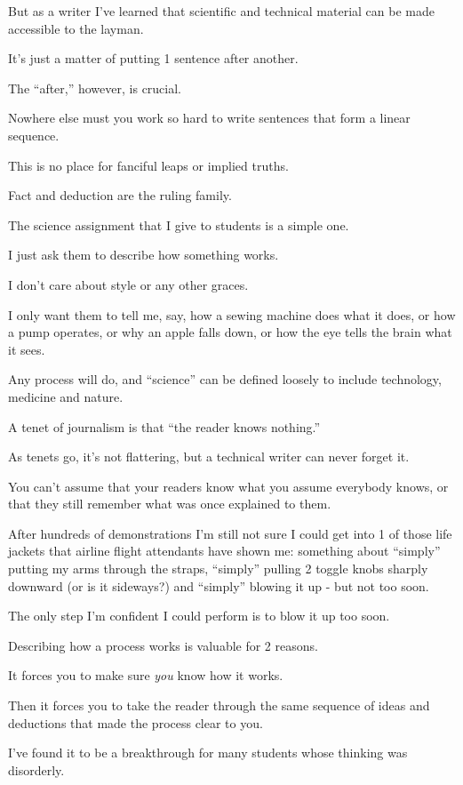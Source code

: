 \documentclass{book}
\numberwithin{equation}{section}
\begin{document}
But as a writer I've learned that scientific and technical material can be made accessible to the layman.

It's just a matter of putting 1 sentence after another.

The ``after,'' however, is crucial.

Nowhere else must you work so hard to write sentences that form a linear sequence.

This is no place for fanciful leaps or implied truths.

Fact and deduction are the ruling family.

%
The science assignment that I give to students is a simple one.

I just ask them to describe how something works.

I don't care about style or any other graces.

I only want them to tell me, say, how a sewing machine does what it does, or how a pump operates, or why an apple falls down, or how the eye tells the brain what it sees.

Any process will do, and ``science'' can be defined loosely to include technology, medicine and nature.

%
A tenet of journalism is that ``the reader knows nothing.''

As tenets go, it's not flattering, but a technical writer can never forget it.

You can't assume that your readers know what you assume everybody knows, or that they still remember what was once explained to them.

After hundreds of demonstrations I'm still not sure I could get into 1 of those life jackets that airline flight attendants have shown me: something about ``simply'' putting my arms through the straps, ``simply'' pulling 2 toggle knobs sharply downward (or is it sideways?) and ``simply'' blowing it up - but not too soon.

The only step I'm confident I could perform is to blow it up too soon.

Describing how a process works is valuable for 2 reasons.

It forces you to make sure \textit{you} know how it works.

Then it forces you to take the reader through the same sequence of ideas and deductions that made the process clear to you.

I've found it to be a breakthrough for many students whose thinking was disorderly.
\end{document}
